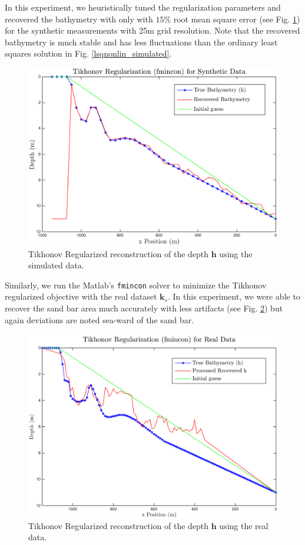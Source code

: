 In this experiment, we heuristically tuned the regularization parameters and recovered the bathymetry with only with $15\%$ root mean square error (see Fig. \ref{fmincon_simulated}) for the synthetic measurements with 25m grid resolution. Note that the recovered bathymetry is much stable and has less fluctuations than the ordinary least squares solution in Fig. \ref{lsqnonlin_simulated}.   
 
\begin{figure}[H]
\center
\includegraphics[scale=0.47]{img/fmincon_simulated_25_new.png} %
\caption{Tikhonov Regularized reconstruction of the depth $\mathbf{h}$ using the simulated data.}
\label{fmincon_simulated}
\end{figure}

Similarly, we run the Matlab's \verb|fmincon| solver to minimize the Tikhonov regularized objective with the real dataset $\mathbf{k}_s$. In this experiment, we were able to recover the sand bar area much accurately with less artifacts (see Fig. \ref{fmincon_real}) but again deviations are noted sea-ward of the sand bar.

\begin{figure}[H]
\center
\includegraphics[scale=0.46]{img/fmincon_real_data_oct09.png} %
\caption{Tikhonov Regularized reconstruction of the depth $\mathbf{h}$ using the real data.}
\label{fmincon_real}
\end{figure}





